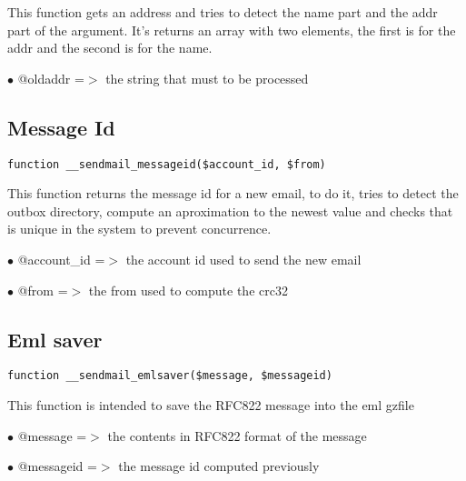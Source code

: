 \documentclass[a4paper]{book}
\begin{document}
This function gets an address and tries to detect the name part and the addr
part of the argument. It's returns an array with two elements, the first is
for the addr and the second is for the name.

\begin{compactitem}
\item[\color{myblue}$\bullet$] @oldaddr =$>$ the string that must to be processed
\end{compactitem}

\hypertarget{toc69}{}
\subsection{Message Id}

\begin{lstlisting}
function __sendmail_messageid($account_id, $from)
\end{lstlisting}

This function returns the message id for a new email, to do it, tries
to detect the outbox directory, compute an aproximation to the newest
value and checks that is unique in the system to prevent concurrence.

\begin{compactitem}
\item[\color{myblue}$\bullet$] @account\_id =$>$ the account id used to send the new email
\item[\color{myblue}$\bullet$] @from       =$>$ the from used to compute the crc32
\end{compactitem}

\hypertarget{toc70}{}
\subsection{Eml saver}

\begin{lstlisting}
function __sendmail_emlsaver($message, $messageid)
\end{lstlisting}

This function is intended to save the RFC822 message into the eml gzfile

\begin{compactitem}
\item[\color{myblue}$\bullet$] @message   =$>$ the contents in RFC822 format of the message
\item[\color{myblue}$\bullet$] @messageid =$>$ the message id computed previously
\end{compactitem}
\end{document}
